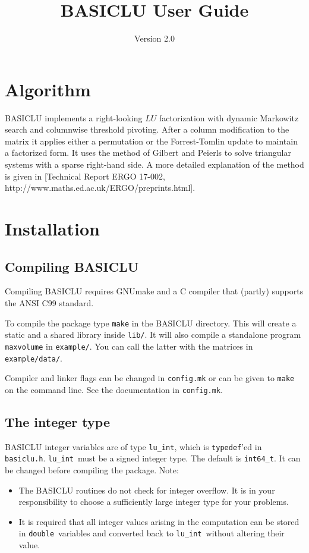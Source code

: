 \documentclass{article}
\title{BASICLU User Guide}
\author{Version 2.0}
\newcommand{\ct}{\texttt}
\newcommand{\luint}{\ct{lu\_int}}
\newcommand{\double}{\ct{double}}
\begin{document}
\maketitle

\tableofcontents
\newpage

\section{Algorithm}
BASICLU implements a right-looking $LU$ factorization with dynamic Markowitz
search and columnwise threshold pivoting. After a column modification to the
matrix it applies either a permutation or the Forrest-Tomlin update to maintain
a factorized form. It uses the method of Gilbert and Peierls to solve triangular
systems with a sparse right-hand side. A more detailed explanation of the method
is given in [Technical Report ERGO 17-002,
http://www.maths.ed.ac.uk/ERGO/preprints.html].

\section{Installation}
\subsection{Compiling BASICLU}
Compiling BASICLU requires GNUmake and a C compiler that (partly) supports the
ANSI C99 standard.

To compile the package type \ct{make} in the BASICLU directory. This will create
a static and a shared library inside \ct{lib/}. It will also compile a
standalone program \ct{maxvolume} in \ct{example/}. You can call the latter with
the matrices in \ct{example/data/}.

Compiler and linker flags can be changed in \ct{config.mk} or can be given to
\ct{make} on the command line. See the documentation in \ct{config.mk}.

\subsection{The integer type}
BASICLU integer variables are of type \luint, which is \ct{typedef}'ed in
\ct{basiclu.h}. \luint\ must be a signed integer type. The default is
\ct{int64\_t}. It can be changed before compiling the package. Note:
\begin{itemize}
\item The BASICLU routines do not check for integer overflow. It is in your
  responsibility to choose a sufficiently large integer type for your problems.
\item It is required that all integer values arising in the computation can be
  stored in \double\ variables and converted back to \luint\ without altering
  their value.
\end{itemize}
\end{document}
